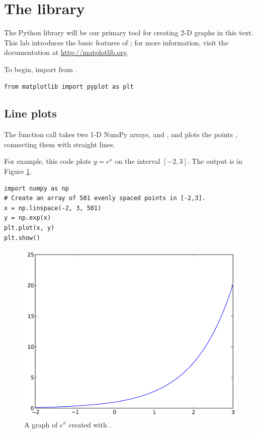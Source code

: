 \label{lab:Matplotlib_and_Mayavi}

\section*{The  library}
The Python library  will be our primary tool for creating 2-D graphs in this text. This lab introduces the basic features of ; for more information, visit the documentation at \url{http://matplotlib.org}.

To begin, import  from .
\begin{lstlisting}
from matplotlib import pyplot as plt
\end{lstlisting}

\subsection*{Line plots}
The function call  takes two 1-D NumPy arrays,  and , and plots the points , connecting them with straight lines.

For example, this code plots $y=e^x$ on the interval $[-2,3]$. The output is in Figure \ref{fig:exp_plot}.
\begin{lstlisting}
import numpy as np
# Create an array of 501 evenly spaced points in [-2,3].
x = np.linspace(-2, 3, 501)
y = np.exp(x)
plt.plot(x, y)
plt.show()
\end{lstlisting}

\begin{figure}
\centering
\includegraphics[width=\textwidth]{exp_plot.pdf}
\caption{A graph of $e^x$ created with .}
\label{fig:exp_plot}
\end{figure}

